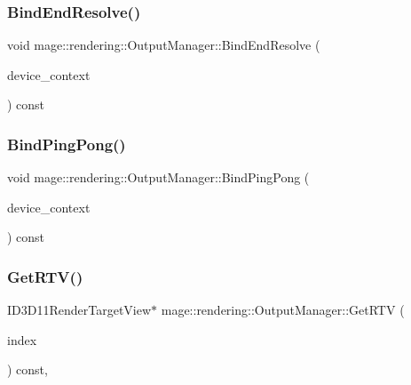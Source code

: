 \subsubsection{\texorpdfstring{Bind\+End\+Resolve()}{BindEndResolve()}}
{\footnotesize\ttfamily void mage\+::rendering\+::\+Output\+Manager\+::\+Bind\+End\+Resolve (\begin{DoxyParamCaption}\item[{I\+D3\+D11\+Device\+Context \&}]{device\+\_\+context }\end{DoxyParamCaption}) const\hspace{0.3cm}{\ttfamily [noexcept]}}

\hypertarget{classmage_1_1rendering_1_1_output_manager_aacb8da12f24fe9b7f1c3aac6f52ba9a1}{}\label{classmage_1_1rendering_1_1_output_manager_aacb8da12f24fe9b7f1c3aac6f52ba9a1} 
\subsubsection{\texorpdfstring{Bind\+Ping\+Pong()}{BindPingPong()}}
{\footnotesize\ttfamily void mage\+::rendering\+::\+Output\+Manager\+::\+Bind\+Ping\+Pong (\begin{DoxyParamCaption}\item[{I\+D3\+D11\+Device\+Context \&}]{device\+\_\+context }\end{DoxyParamCaption}) const\hspace{0.3cm}{\ttfamily [noexcept]}}

\hypertarget{classmage_1_1rendering_1_1_output_manager_a2088241f582fd9b119f485c5e9a13b30}{}\label{classmage_1_1rendering_1_1_output_manager_a2088241f582fd9b119f485c5e9a13b30} 
\subsubsection{\texorpdfstring{Get\+R\+T\+V()}{GetRTV()}}
{\footnotesize\ttfamily I\+D3\+D11\+Render\+Target\+View$\ast$ mage\+::rendering\+::\+Output\+Manager\+::\+Get\+R\+TV (\begin{DoxyParamCaption}\item[{\hyperlink{classmage_1_1rendering_1_1_output_manager_af9caebb7e9cacf454d26b827a01e857c}{R\+T\+V\+Index}}]{index }\end{DoxyParamCaption}) const\hspace{0.3cm}{\ttfamily [private]}, {\ttfamily [noexcept]}}

